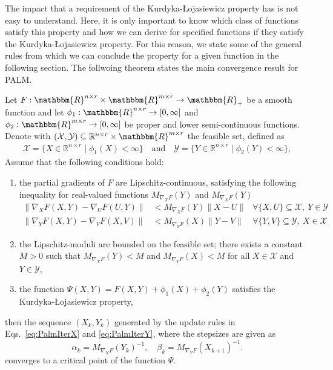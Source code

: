 The impact that a requirement of the Kurdyka-{\L}ojasiewicz property has is not easy to understand. Here, it is only important to know which class of functions satisfy this property and how we can derive for specified functions if they satisfy the Kurdyka-{\L}ojasiewicz property. For this reason, we state some of the general rules from which we can conclude the \KL property for a given function in the following section. The follwoing theorem states the main convergence result for PALM.

\begin{theorem}{{\citep{bolte2014proximal}}}\label{thm:palmConv}
Let $F:\mathbbm{R}^{n\times r}\times \mathbbm{R}^{m\times r}\rightarrow \mathbbm{R}_+$ be a smooth function and let $\phi_1:\mathbbm{R}^{n\times r}\rightarrow [0,\infty]$ and $\phi_2:\mathbbm{R}^{m\times r}\rightarrow [0,\infty]$ be proper and lower semi-continuous functions. Denote with $(\mathcal{X},\mathcal{Y})\subseteq\mathbb{R}^{n\times r}\times \mathbbm{R}^{m\times r}$ the feasible set, defined as
\begin{align*}
    \mathcal{X} = \{X\in \mathbb{R}^{n\times r}\mid \phi_1(X)<\infty\}\quad \text{and} \quad \mathcal{Y} = \{Y\in \mathbb{R}^{n\times r}\mid \phi_2(Y)<\infty\},
\end{align*}
Assume that the following conditions hold:
\begin{enumerate}
\item the partial gradients of $F$ are Lipschitz-continuous, satisfying the following inequality for real-valued functions $M_{\nabla_XF}(Y)$ and $M_{\nabla_XF}(Y)$
\begin{align*}
\|\nabla_XF(X,Y)-\nabla_UF(U,Y)\|&< M_{\nabla_XF}(Y)\|X-U\| &\forall \{X,U\} \subseteq \mathcal{X},\ Y\in\mathcal{Y}\\
\|\nabla_YF(X,Y)-\nabla_VF(X,V)\|&< M_{\nabla_YF}(X)\|Y-V\| &\forall \{Y,V\} \subseteq \mathcal{Y},\ X\in\mathcal{X}
\end{align*}
\item the Lipschitz-moduli are bounded on the feasible set; there exists a constant $M>0$ such that $M_{\nabla_XF}(Y)<M$ and $M_{\nabla_YF}(X)<M$ for all $X\in\mathcal{X}$ and $Y\in\mathcal{Y}$,
\item the function $\Psi(X,Y)=F(X,Y)+\phi_1(X)+\phi_2(Y)$ satisfies the Kurdyka-{\L}ojasiewicz property,
\end{enumerate}
then the sequence $(X_k,Y_k)$ generated by the update rules in Eqs.~\eqref{eq:PalmIterX} and \eqref{eq:PalmIterY}, where the stepsizes are given as
\[\alpha_k=M_{\nabla_XF}(Y_k)^{-1}, \quad \beta_k= M_{\nabla_YF}(X_{k+1})^{-1}.\]
converges to a critical point of the function $\Psi$. 
\end{theorem}
